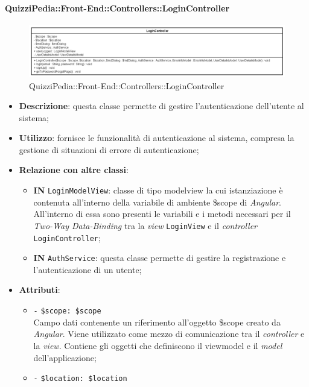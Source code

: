 \paragraph{QuizziPedia::Front-End::Controllers::LoginController}
\begin{figure} [ht]
	\centering
	\includegraphics[scale=0.60]{UML/Classi/Front-End/QuizziPedia_Front-end_Controller_LoginController.png}
	\caption{QuizziPedia::Front-End::Controllers::LoginController}
\end{figure} \FloatBarrier
\begin{itemize}
	\item \textbf{Descrizione}: questa classe permette di gestire l'autenticazione dell'utente al sistema; 
	\item \textbf{Utilizzo}: fornisce le funzionalità di autenticazione al sistema, compresa la gestione di situazioni di errore di autenticazione;
	\item \textbf{Relazione con altre classi}:
	\begin{itemize}
		\item \textbf{IN} \texttt{LoginModelView}: classe di tipo modelview la cui istanziazione è contenuta all'interno della variabile di ambiente \$scope di \textit{Angular}. All'interno di essa sono presenti le variabili e i metodi necessari per il \textit{Two-Way Data-Binding} tra la \textit{view} \texttt{LoginView} e il \textit{controller} \texttt{LoginController};
		\item \textbf{IN} \texttt{AuthService}: questa classe permette di gestire la registrazione e l'autenticazione di un utente;
	\end{itemize}
	\item \textbf{Attributi}:
	\begin{itemize}
		\item \texttt{-} \texttt{\$scope: \$scope} \\
		Campo dati contenente un riferimento all’oggetto \$scope creato da \textit{Angular}. Viene utilizzato come mezzo di comunicazione tra il \textit{controller} e la \textit{view}. Contiene gli oggetti che definiscono il viewmodel e il \textit{model} dell’applicazione;
		\item \texttt{-} \texttt{\$location: \$location} \\

\end{itemize}
\end{itemize}
